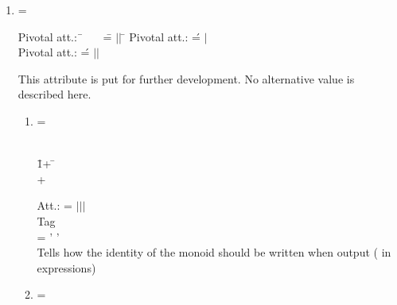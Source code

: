 \begin{enumerate}
\begin{enumerate}
\item  {} = 

\smallskip
\begin{tabbing}
\ptn Pivotal att.:\= \ \ \ \  \= = $|$$|$
                            \tagsp \=\token   \req \kill 
\ptn Pivotal att.: 
\>\>  \'= $|$ 
\> \token   \req\\

\ptn Pivotal att.: 
\>\>  \'= $|$$|$
                        \>\token   \req  
\end{tabbing}


This attribute  is put for further development.
         No alternative value is described here.

         \smallskip
\begin{enumerate}

\item  {} = 

\smallskip
\begin{tabbing}
      \\[\taglnskp]
\tagindent{}\tagsp \=1+ \occ \=\opt \kill
\tagindent{} \> \> \opt\\[\taglnskp]
\tagindent{} + \occ \>\req \\[\taglnskp]
\end{tabbing}

\smallskip
\begin{tabbing}
\ptn Att.:  =
    $|$$|$$|$ 
    \tagsp \token \req \\

\ptn Tag    \\
\tagindent {} = ' ' \tagsp \strng \\ Tells how the
                                        identity of the monoid should
                                        be written when output (\eg
                                        in expressions)
                                    \end{tabbing}

                                    \smallskip
\item  {} = 


\end{enumerate}
\end{enumerate}
\end{enumerate}
